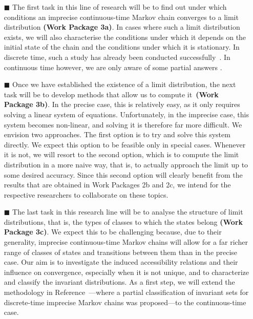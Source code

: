 \documentclass[11pt,dvipsnames,usenames,a4paper]{article}
\begin{document}
\vspace{6pt}
\begin{itemize}
\item[\tiny$\blacksquare$] 
The first task in this line of research will be to find out under which conditions an imprecise continuous-time Markov chain converges to a limit distribution {\bf (Work Package 3a)}. In cases where such a limit distribution exists, we will also characterise the conditions under which it depends on the initial state of the chain and the conditions under which it is stationary. In discrete time, such a study has already been conducted successfully~\cite{hermans2012,cooman2008}. In continuous time however, we are only aware of some partial answers \cite{DeBock:2016:iCTMClimit}. 

\item[\tiny$\blacksquare$]
Once we have established the existence of a limit distribution, the next task will be to develop methods that allow us to compute it~{\bf (Work Package 3b)}. In the precise case, this is relatively easy, as it only requires solving a linear system of equations. Unfortunately, in the imprecise case, this system becomes non-linear, and solving it is therefore far more difficult. We envision two approaches. The first option is to try and solve this system directly. We expect this option to be feasible only in special cases. Whenever it is not, we will resort to the second option, which is to compute the limit distribution in a more naive way, that is, to actually approach the limit up to some desired accuracy. Since this second option will clearly benefit from the results that are obtained in Work Packages 2b and 2c, we intend for the respective researchers to collaborate on these topics.


\item[\tiny$\blacksquare$]
The last task in this research line will be to analyse the structure of limit distributions, that is, the types of classes to which the states belong {\bf (Work Package 3c)}. We expect this to be challenging because, due to their generality, imprecise continuous-time Markov chains will allow for a far richer range of classes of states and transitions between them than in the precise case. Our aim is to investigate the induced accessibility relations and their influence on convergence, especially when it is not unique, and to characterize and classify the invariant distributions. As a first step, we will extend the methodology in Reference~\cite{skulj:13b}---where a partial classification of invariant sets for discrete-time imprecise Markov chains was proposed---to the continuous-time case. 

\vspace{8pt}
\end{itemize}
\end{document}
